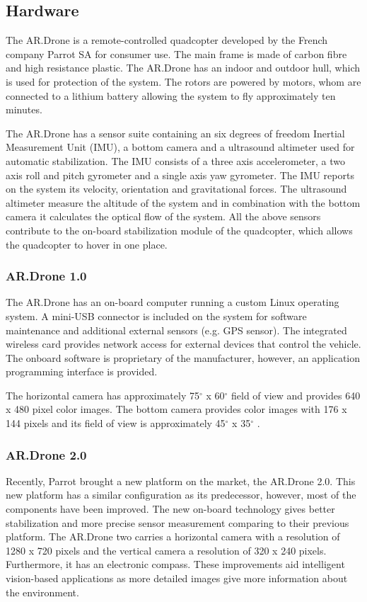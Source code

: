\documentclass[a4paper]{article}
\begin{document}
\begin{appendices}
\subsection{Hardware}
The AR.Drone is a remote-controlled quadcopter developed by the French company Parrot SA for consumer use. The main frame is made of carbon fibre and high resistance plastic. The AR.Drone has an indoor and outdoor hull, which is used for protection of the system. The rotors are powered by motors, whom are connected to a lithium battery allowing the system to fly approximately ten minutes.

The AR.Drone has a sensor suite containing an six degrees of freedom Inertial Measurement Unit (IMU), a bottom camera and a ultrasound altimeter used for automatic stabilization. The IMU consists of a three axis accelerometer, a two axis roll and pitch gyrometer and a single axis yaw gyrometer. The IMU reports on the system its velocity, orientation and gravitational forces. The ultrasound altimeter measure the altitude of the system and in combination with the bottom camera it calculates the optical flow of the system. All the above sensors contribute to the on-board stabilization module of the quadcopter, which allows the quadcopter to hover in one place.

\subsubsection{AR.Drone 1.0}
The AR.Drone has an on-board computer running a custom Linux operating system. A mini-USB connector is included on the system for software maintenance and additional external sensors (e.g. GPS sensor). The integrated wireless card provides network access for external devices that control the vehicle. The onboard software is proprietary of the manufacturer, however, an application programming interface is provided.

The horizontal camera has approximately 75$^{\circ}$ x 60$^{\circ}$ field of view and provides 640 x 480 pixel color images. The bottom camera provides color images with 176 x 144 pixels and its field of view is approximately 45$^{\circ}$ x 35$^{\circ}$ \cite{Krajnik2011}.

\subsubsection{AR.Drone 2.0}
Recently, Parrot brought a new platform on the market, the AR.Drone 2.0. This new platform has a similar configuration as its predecessor, however, most of the components have been improved. The new on-board technology gives better stabilization and more precise sensor measurement comparing to their previous platform. The AR.Drone two carries a horizontal camera with a resolution of 1280 x 720 pixels and the vertical camera a resolution of 320 x 240 pixels. Furthermore, it has an electronic compass. These improvements aid intelligent vision-based applications as more detailed images give more information about the environment.


\end{appendices}
\end{document}
